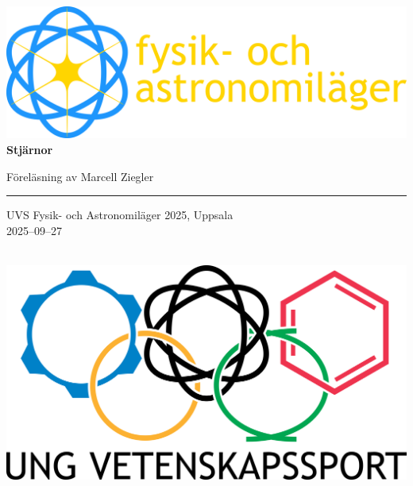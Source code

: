 \documentclass[12pt, a4paper]{article}
\begin{document}

    \begin{center}
        \noindent
        \vfill
        \includegraphics[width=.8\textwidth]{img/logga-fysiklager.png}
        \vfill
        {\Huge \textbf{Stjärnor}}\\[3pt]
        {\Large Föreläsning av Marcell Ziegler\\
        \rule{\textwidth}{2pt}
        UVS Fysik- och Astronomiläger 2025, Uppsala\\[2mm]
        2025--09--27}\\
        \vfill
        \includegraphics[width=.5\textwidth]{img/logga-uvs.png}
        \vfill
    \end{center}

    \newpage

    \setlength{\parskip}{0.6\baselineskip}
    \setlength{\parindent}{0pt}

    
    
    \solutionnewpage
    

    \newpage
    \appendix
    
\end{document}
